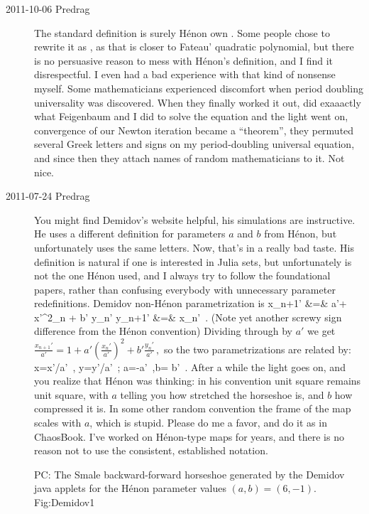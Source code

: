 \begin{description}
\item[2011-10-06 Predrag]
The standard definition is surely H\'enon own .
Some people chose to rewrite it as , as that is closer to
Fateau' quadratic polynomial, but there is no persuasive reason to mess
with H\'enon's definition, and I find it disrespectful. I even had a bad
experience with that kind of nonsense myself. Some mathematicians
experienced discomfort when period doubling universality was discovered.
When they finally worked it out, did exaaactly what Feigenbaum and I did
to solve the equation and the light went on, convergence of our Newton
iteration became a ``theorem'', they permuted several Greek letters and
signs on my period-doubling universal equation, and since then they
attach names of random mathematicians to it. Not nice.

\item[2011-07-24 Predrag]
                                    \toCB
You might find Demidov's website helpful, his simulations
are instructive. He uses a different definition for parameters $a$ and
$b$ from H\'enon, but unfortunately uses the same letters. Now, that's in
a really bad taste. His definition is natural if one is interested in
Julia sets, but unfortunately is not the one H\'enon used, and I always
try to follow the foundational papers, rather than confusing everybody
with unnecessary parameter redefinitions. Demidov
non-H\'enon  parametrization is
\bea
    x_{n+1}' &=& a'+ {x'}{}^2_n + b' y_n'
        \continue
    y_{n+1}' &=& x_n'
\,.
\label{DemidHen1}
\eea
(Note yet another screwy sign difference from the H\'enon convention)
Dividing through by $a'$ we get
\(
\frac{x_{n+1}'}{a'} = 1 + a'\left(\frac{x_n'}{a'}\right)^2 + b'\frac{y_n'}{a'}
\,,
\)
so the two parametrizations are related by:
\beq
x={x'}/{a'}
\,,\quad
y={y'}/{a'}
\,;\qquad
a=-{a'}
\,,\quad b= {b'}
\,.
After a while the light goes on, and you realize that H\'enon was
thinking: in his convention unit square remains unit square, with $a$
telling you how stretched the horseshoe is, and $b$ how compressed it is.
In some other random convention the frame of the map scales with $a$,
which is stupid. Please do me a favor, and do it as in ChaosBook. I've
worked on H\'enon-type maps for years, and there is no reason not to use
the consistent, established notation.

{}{
PC: The Smale backward-forward horseshoe generated by the
Demidov java applets for the H\'enon parameter values
$(a,b) = (6,-1)$.
    }{Fig:Demidov1}


\end{description}
